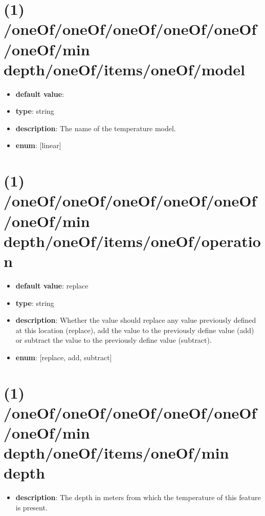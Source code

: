 \section{(1) /oneOf/oneOf/oneOf/oneOf/oneOf/oneOf/min depth/oneOf/items/oneOf/model}
\begin{itemize}[leftmargin=1em]\item {\bf default value}: 
\item {\bf type}: string
\item {\bf description}: The name of the temperature model.
\item {\bf enum}: [linear]\end{itemize}\section{(1) /oneOf/oneOf/oneOf/oneOf/oneOf/oneOf/min depth/oneOf/items/oneOf/operation}
\begin{itemize}[leftmargin=1em]\item {\bf default value}: replace
\item {\bf type}: string
\item {\bf description}: Whether the value should replace any value previously defined at this location (replace), add the value to the previously define value (add) or subtract the value to the previously define value (subtract).
\item {\bf enum}: [replace, add, subtract]\end{itemize}\section{(1) /oneOf/oneOf/oneOf/oneOf/oneOf/oneOf/min depth/oneOf/items/oneOf/min depth}
\begin{itemize}[leftmargin=1em]\item {\bf description}: The depth in meters from which the temperature of this feature is present.
\end{itemize}
